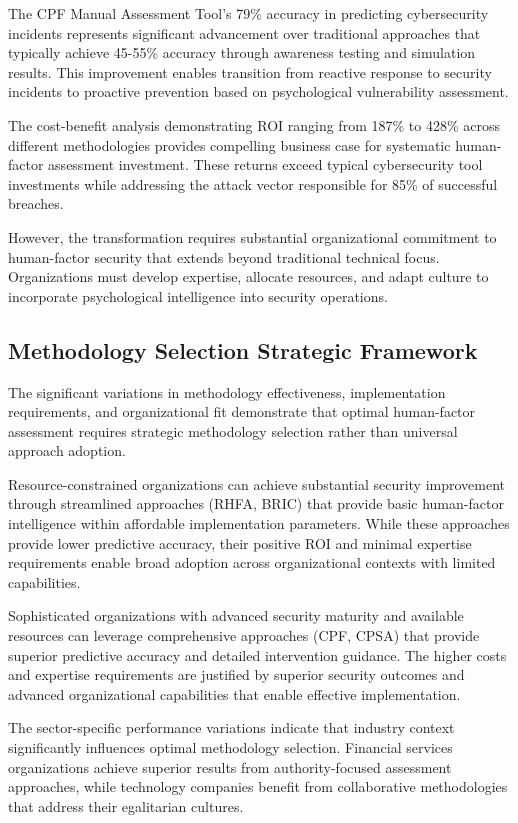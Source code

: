\documentclass[10pt, twocolumn]{article}
\begin{document}
The CPF Manual Assessment Tool's 79\% accuracy in predicting cybersecurity incidents represents significant advancement over traditional approaches that typically achieve 45-55\% accuracy through awareness testing and simulation results. This improvement enables transition from reactive response to security incidents to proactive prevention based on psychological vulnerability assessment.

The cost-benefit analysis demonstrating ROI ranging from 187\% to 428\% across different methodologies provides compelling business case for systematic human-factor assessment investment. These returns exceed typical cybersecurity tool investments while addressing the attack vector responsible for 85\% of successful breaches.

However, the transformation requires substantial organizational commitment to human-factor security that extends beyond traditional technical focus. Organizations must develop expertise, allocate resources, and adapt culture to incorporate psychological intelligence into security operations.

\subsection{Methodology Selection Strategic Framework}

The significant variations in methodology effectiveness, implementation requirements, and organizational fit demonstrate that optimal human-factor assessment requires strategic methodology selection rather than universal approach adoption.

Resource-constrained organizations can achieve substantial security improvement through streamlined approaches (RHFA, BRIC) that provide basic human-factor intelligence within affordable implementation parameters. While these approaches provide lower predictive accuracy, their positive ROI and minimal expertise requirements enable broad adoption across organizational contexts with limited capabilities.

Sophisticated organizations with advanced security maturity and available resources can leverage comprehensive approaches (CPF, CPSA) that provide superior predictive accuracy and detailed intervention guidance. The higher costs and expertise requirements are justified by superior security outcomes and advanced organizational capabilities that enable effective implementation.

The sector-specific performance variations indicate that industry context significantly influences optimal methodology selection. Financial services organizations achieve superior results from authority-focused assessment approaches, while technology companies benefit from collaborative methodologies that address their egalitarian cultures.
\end{document}
